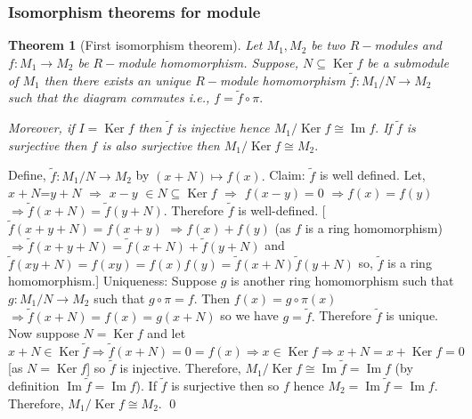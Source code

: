 \documentclass[11pt]{amsart}
\newtheorem{theorem}{Theorem}[section]
\begin{document}
\subsubsection{Isomorphism theorems for module}
\begin{theorem}[First isomorphism theorem]
Let $M_1,M_2$ be two $R-$modules and $f:M_1\to M_2$ be $R-$module homomorphism. Suppose, $N\subseteq \operatorname{Ker}f$ be a submodule of $M_1$ then there exists an unique $R-$module homomorphism $\tilde{f}:M_1/N\to M_2$ such that the diagram commutes i.e., $f=\tilde{f}\circ \pi.$\\
\begin{center}
\end{center}
Moreover, if $I=\operatorname{Ker}f$ then $\tilde{f}$ is injective hence $M_1/\operatorname{Ker}f\cong \operatorname{Im}f.$ If $\tilde{f}$ is surjective then $f$ is also surjective then $M_1/\operatorname{Ker}f\cong M_2.$
\end{theorem}
\proof Define, $\tilde{f}:M_1/N\rightarrow M_2$ by $(x+N)\mapsto f(x).$ Claim: $\tilde{f}$ is well defined. Let, $x+N$=$y+N$ $\Rightarrow$ $x-y$ $\in N\subseteq \operatorname{Ker}f$ $\Rightarrow$ $f(x-y)=0$ $\Rightarrow f(x)=f(y)$ $\Rightarrow \tilde{f}(x+N)=\tilde{f}(y+N).$ Therefore $\tilde{f}$ is well-defined. [$\tilde{f}(x+y+N)=f(x+y)$ $\Rightarrow f(x)+f(y)$ (as $f$ is a ring homomorphism) $\Rightarrow \tilde{f}(x+y+N)=\tilde{f}(x+N)+\tilde{f}(y+N)$
and $\tilde{f}(xy+N)=f(xy)=f(x)f(y)=\tilde{f}(x+N)\tilde{f}(y+N)$ so, $\tilde{f}$ is a ring homomorphism.] Uniqueness: Suppose $g$ is another ring homomorphism such that $g:M_1/N\rightarrow M_2$ such that $g\circ\pi=f.$ Then $f(x)=g\circ\pi(x)$ $\Rightarrow \tilde{f}(x+N)=f(x)=g(x+N)$ so we have $g=\tilde{f}.$ Therefore $\tilde{f}$ is unique. Now suppose $N=\operatorname{Ker}f$ and let $x+N\in \operatorname{Ker}\tilde{f} \Rightarrow \tilde{f}(x+N)=0=f(x) \Rightarrow x\in \operatorname{Ker}f \Rightarrow x+N=x+\operatorname{Ker}f=0$ [as $N=\operatorname{Ker}f$] so $\tilde{f}$ is injective. Therefore, $M_1/\operatorname{Ker}f \cong \operatorname{Im}\tilde{f}=\operatorname{Im}{f}$ (by definition $\operatorname{Im}\tilde{f}=\operatorname{Im}{f}$). If $\tilde{f}$ is surjective then so $f$ hence $M_2=\operatorname{Im}\tilde{f}=\operatorname{Im}{f}.$ Therefore, $M_1/\operatorname{Ker}f \cong M_2$.  \qed\\\\
\end{document}
